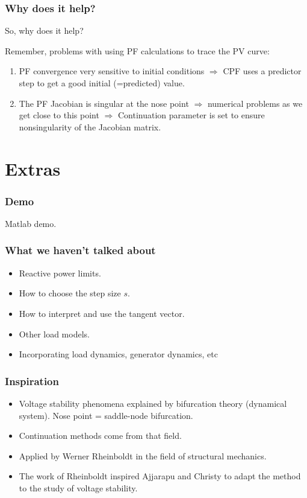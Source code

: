 \documentclass{beamer}
\begin{document}
\begin{frame}
\frametitle{Why does it help?}
So, why does it help?

Remember, problems with using PF calculations to trace the PV curve:
\begin{enumerate}
\item PF convergence very sensitive to initial conditions $\Rightarrow$ CPF uses a predictor step to get a good initial (=predicted) value.
\item The PF Jacobian is singular at the nose point $\Rightarrow$ numerical problems as we get close to this point $\Rightarrow$ Continuation parameter is set to ensure nonsingularity of the Jacobian matrix.
\end{enumerate}
\end{frame}

\section{Extras}

\begin{frame}
  \frametitle{Demo}
  Matlab demo.
\end{frame}

\begin{frame}
  \frametitle{What we haven't talked about}
  \begin{itemize}
  \item Reactive power limits.
  \item How to choose the step size $s$.
  \item How to interpret and use the tangent vector.
  \item Other load models.
  \item Incorporating load dynamics, generator dynamics, etc
  \end{itemize}
\end{frame}

\begin{frame}
  \frametitle{Inspiration}
  \begin{itemize}
  \item Voltage stability phenomena explained by bifurcation theory (dynamical system). Nose point = saddle-node bifurcation.
  \item Continuation methods come from that field.
  \item Applied by Werner Rheinboldt in the field of structural mechanics.
  \item The work of Rheinboldt inspired Ajjarapu and Christy to adapt the method to the study of voltage stability.
  \end{itemize}
\end{frame}
\end{document}
